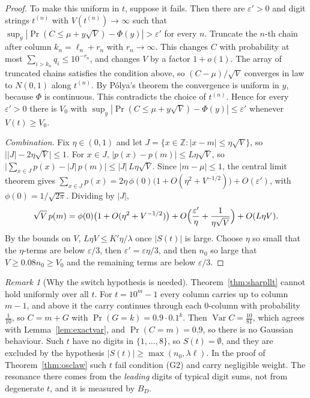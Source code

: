 \documentclass[11pt]{article}
\theoremstyle{definition}
\theoremstyle{remark}
\newtheorem{remark}[theorem]{Remark}
\begin{document}
\begin{proof}
To make this uniform in $t$, suppose it fails. Then there are
$\varepsilon'>0$ and digit strings $t^{(n)}$ with $V(t^{(n)})\to\infty$ such that
$\sup_y|\Pr(C\le\mu+y\sqrt V)-\Phi(y)|>\varepsilon'$ for every $n$. Truncate
the $n$-th chain after column $k_n=\ell_n+r_n$ with $r_n\to\infty$. This
changes $C$ with probability at most $\sum_{i>k_n}q_i\le10^{-r_n}$, and
changes $V$ by a factor $1+o(1)$. The array of truncated chains satisfies the
condition above, so $(C-\mu)/\sqrt V$ converges in law to $N(0,1)$ along
$t^{(n)}$. By P\'olya's theorem the convergence is uniform in $y$, because
$\Phi$ is continuous. This contradicts the choice of $t^{(n)}$. Hence for every
$\varepsilon'>0$ there is $V_0$ with
$\sup_y|\Pr(C\le\mu+y\sqrt V)-\Phi(y)|\le\varepsilon'$ whenever
$V(t)\ge V_0$.

\emph{Combination.} Fix $\eta\in(0,1)$ and let
$J=\{x\in\mathbb Z:|x-m|\le\eta\sqrt V\}$, so $\bigl||J|-2\eta\sqrt V\bigr|\le1$.
For $x\in J$, $|p(x)-p(m)|\le L\eta\sqrt V$, so
$\bigl|\sum_{x\in J}p(x)-|J|\,p(m)\bigr|\le|J|\,L\eta\sqrt V$. Since
$|m-\mu|\le1$, the central limit theorem gives
$\sum_{x\in J}p(x)=2\eta\,\phi(0)\bigl(1+O(\eta^2+V^{-1/2})\bigr)+O(\varepsilon')$,
with $\phi(0)=1/\sqrt{2\pi}$. Dividing by $|J|$,
\[
  \sqrt V\,p(m)=\phi(0)\bigl(1+O(\eta^2+V^{-1/2})\bigr)
  +O\Bigl(\frac{\varepsilon'}\eta+\frac1{\eta\sqrt V}\Bigr)+O(L\eta V).
\]
By the bounds on $V$, $L\eta V\le K'\eta/\lambda$ once $|S(t)|$ is large. Choose
$\eta$ so small that the $\eta$-terms are below $\varepsilon/3$, then
$\varepsilon'=\varepsilon\eta/3$, and then $n_0$ so large that
$V\ge0.08n_0\ge V_0$ and the remaining terms are below $\varepsilon/3$.
\end{proof}

\begin{remark}[Why the switch hypothesis is needed]\label{rem:degenerate}
Theorem~\ref{thm:sharpllt} cannot hold uniformly over all $t$. For
$t=10^m-1$ every column carries up to column $m-1$, and above it the carry
continues through each $0$-column with probability $\frac1{10}$, so $C=m+G$ with
$\Pr(G=k)=0.9\cdot0.1^k$. Then $\operatorname{Var}C=\frac{10}{81}$, which agrees
with Lemma~\ref{lem:exactvar}, and $\Pr(C=m)=0.9$, so there is no Gaussian
behaviour. Such $t$ have no digits in $\{1,\dots,8\}$, so $S(t)=\emptyset$, and
they are excluded by the hypothesis $|S(t)|\ge\max(n_0,\lambda\ell)$. In the
proof of Theorem~\ref{thm:osclaw} such $t$ fail condition (G2) and carry
negligible weight. The resonance there comes from the \emph{leading} digits of
typical digit sums, not from degenerate $t$, and it is measured by $B_D$.
\end{remark}
\end{document}
